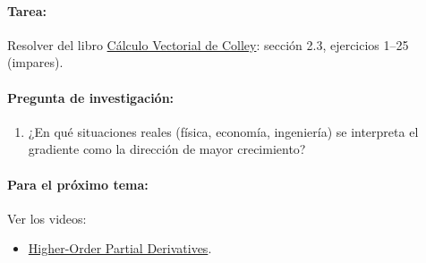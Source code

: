 \documentclass[a4,11pt]{aleph-notas}
\begin{document}
\paragraph{Tarea:}
Resolver del libro \href{https://catalogobiblioteca.puce.edu.ec/cgi-bin/koha/opac-detail.pl?biblionumber=83405&query_desc=su%3A%22An%C3%A1lisis%20vectorial%22}{Cálculo Vectorial de Colley}: sección 2.3, ejercicios 1--25 (impares).

\paragraph{Pregunta de investigación:}
\begin{enumerate}[leftmargin=*]
    \item ¿En qué situaciones reales (física, economía, ingeniería) se interpreta el gradiente como la dirección de mayor crecimiento?
\end{enumerate}

\paragraph{Para el próximo tema:}
Ver los videos:
\begin{itemize}[leftmargin=*]
    \item \href{https://youtu.be/UbsiwPk2E8E?si=Thhkl8eagjImxL_0}{Higher-Order Partial Derivatives}.
\end{itemize}
\end{document}
